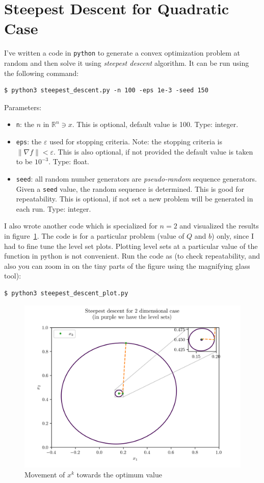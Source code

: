 \documentclass[11pt]{article}
\begin{document}
\section{Steepest Descent for Quadratic Case}
I've written a code in \verb:python: to generate a convex optimization problem at
random and then solve it using \textit{steepest descent} algorithm. It can be run
using the following command:\par
\begin{verbatim}
$ python3 steepest_descent.py -n 100 -eps 1e-3 -seed 150
\end{verbatim}
Parameters:
\begin{itemize}
    \item \verb:n:: the $n$ in $\mathbb{R}^n\ni x$. This is optional, default
        value is 100. Type: integer.
    \item \verb:eps:: the $\varepsilon$ used for stopping criteria. Note: the stopping
        criteria is \hbox{$\lVert\nabla f\rVert<\varepsilon$.} This is also optional,
        if not provided the default value is taken to be $10^{-3}$. Type: float.
    \item \verb:seed:: all random number generators are \textit{pseudo-random}
        sequence generators. Given a \verb:seed: value, the random sequence is
        determined. This is good for repeatability. This is optional, if not set
        a new problem will be generated in each run. Type: integer.
\end{itemize}
I also wrote another code which is specialized for $n=2$ and visualized the results
in figure~\ref{fig:contour_sd}. The code is for a particular problem (value of
$Q$ and $b$) only, since I had to fine tune the level set plots. Plotting level sets
at a particular value of the function in python is not convenient. Run the code
as (to check repeatability, and also you can zoom in on the tiny parts of the figure
using the magnifying glass tool):
\begin{verbatim}
$ python3 steepest_descent_plot.py
\end{verbatim}
\begin{figure}[!htbp]
    \includegraphics[width=\textwidth]{./contour_plot_1.png}
    \caption{Movement of $x^k$ towards the optimum value\label{fig:contour_sd}}
\end{figure}
\end{document}
